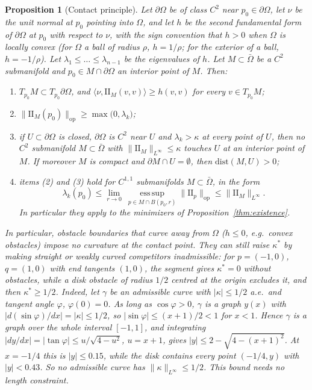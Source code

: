 \documentclass[11pt,reqno]{amsart}
\newtheorem{proposition}[theorem]{Proposition}
\theoremstyle{definition}
\providecommand{\II}{\mathrm{I\!I}}
\newcommand{\op}{\mathrm{op}}
\newcommand{\dist}{\mathrm{dist}}
\numberwithin{equation}{section}
\providecommand{\II}{\mathrm{II}}
\begin{document}
\begin{proposition}[Contact principle]
\label{thm:obstacle_exclusion}
Let $\partial\Omega$ be of class $C^2$ near $p_0 \in \partial\Omega$, let $\nu$ be the unit normal at $p_0$ pointing into $\Omega$, and let $h$ be the second fundamental form of $\partial\Omega$ at $p_0$ with respect to $\nu$, with the sign convention that $h > 0$ when $\Omega$ is locally convex (for $\Omega$ a ball of radius $\rho$, $h = 1/\rho$; for the exterior of a ball, $h = -1/\rho$). Let $\lambda_1 \le \dots \le \lambda_{n-1}$ be the eigenvalues of $h$. Let $M \subset \bar\Omega$ be a $C^2$ submanifold and $p_0 \in M \cap \partial\Omega$ an interior point of $M$. Then:
\begin{enumerate}
    \item $T_{p_0}M \subset T_{p_0}\partial\Omega$, and $\langle \nu, \II_M(v,v) \rangle \ge h(v,v)$ for every $v \in T_{p_0}M$;
    \item $\|\II_M(p_0)\|_{\op} \ge \max\big(0, \lambda_k\big)$;
    \item if $U \subset \partial\Omega$ is closed, $\partial\Omega$ is $C^2$ near $U$ and $\lambda_k > \kappa$ at every point of $U$, then no $C^2$ submanifold $M \subset \bar\Omega$ with $\|\II_M\|_{L^\infty} \le \kappa$ touches $U$ at an interior point of $M$. If moreover $M$ is compact and $\partial M \cap U = \emptyset$, then $\dist(M, U) > 0$;
    \item items (2) and (3) hold for $C^{1,1}$ submanifolds $M \subset \bar\Omega$, in the form
    \begin{equation}
    \label{eq:contact_c11}
    \lambda_k(p_0) \le \lim_{r \to 0}\ \operatorname*{ess\,sup}_{p \in M \cap B(p_0, r)} \|\II_p\|_{\op} \le \|\II_M\|_{L^\infty}.
    \end{equation}
    In particular they apply to the minimizers of Proposition~\ref{thm:existence}.
\end{enumerate}
In particular, obstacle boundaries that curve away from $\Omega$ ($h \le 0$, e.g.\ convex obstacles) impose no curvature \emph{at the contact point}. They can still raise $\kappa^*$ by making straight or weakly curved competitors inadmissible: for $p = (-1,0)$, $q = (1,0)$ with end tangents $(1,0)$, the segment gives $\kappa^* = 0$ without obstacles, while a disk obstacle of radius $1/2$ centred at the origin excludes it, and then $\kappa^* \ge 1/2$. Indeed, let $\gamma$ be an admissible curve with $|\kappa| \le 1/2$ a.e.\ and tangent angle $\varphi$, $\varphi(0) = 0$. As long as $\cos\varphi > 0$, $\gamma$ is a graph $y(x)$ with $|d(\sin\varphi)/dx| = |\kappa| \le 1/2$, so $|\sin\varphi| \le (x+1)/2 < 1$ for $x < 1$. Hence $\gamma$ is a graph over the whole interval $[-1,1]$, and integrating $|dy/dx| = |\tan\varphi| \le u/\sqrt{4-u^2}$, $u = x+1$, gives $|y| \le 2 - \sqrt{4 - (x+1)^2}$. At $x = -1/4$ this is $|y| \le 0.15$, while the disk contains every point $(-1/4, y)$ with $|y| < 0.43$. So no admissible curve has $\|\kappa\|_{L^\infty} \le 1/2$. This bound needs no length constraint.
\end{proposition}
\end{document}
